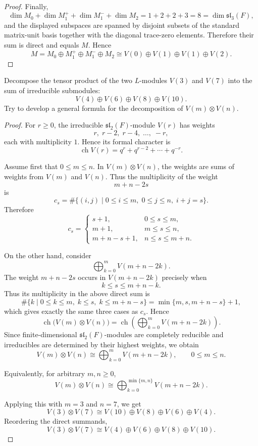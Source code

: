 \begin{proof}
    Finally,
    \[
    \dim M_0+\dim M_1^++\dim M_1^-+\dim M_2
    =
    1+2+2+3=8=\dim \mathfrak{sl}_3(F),
    \]
    and the displayed subspaces are spanned by disjoint subsets of the standard
    matrix-unit basis together with the diagonal trace-zero elements. Therefore their
    sum is direct and equals \(M\). Hence
    \[
    M
    =
    M_0\oplus M_1^+\oplus M_1^-\oplus M_2
    \cong
    V(0)\oplus V(1)\oplus V(1)\oplus V(2).
    \]
    \end{proof}

\begin{exercise}
    [P34, Ex6] Decompose the tensor product of the two \(L\)-modules \(V(3)\) and \(V(7)\) into the sum of irreducible submodules:
    \[
        V(4)\oplus V(6)\oplus V(8)\oplus V(10).
    \]
    Try to develop a general formula for the decomposition of \(V(m)\otimes V(n)\).
\end{exercise}

\begin{proof}
    For \(r\geq 0\), the irreducible \(\mathfrak{sl}_2(F)\)-module \(V(r)\) has
    weights
    \[
    r,\; r-2,\; r-4,\;\ldots,\;-r,
    \]
    each with multiplicity \(1\). Hence its formal character is
    \[
    \operatorname{ch}V(r)=q^r+q^{r-2}+\cdots+q^{-r}.
    \]
    
    Assume first that \(0\leq m\leq n\). In \(V(m)\otimes V(n)\), the weights are
    sums of weights from \(V(m)\) and \(V(n)\). Thus the multiplicity of the weight
    \[
    m+n-2s
    \]
    is
    \[
    c_s
    =
    \#\{(i,j)\mid 0\leq i\leq m,\;0\leq j\leq n,\; i+j=s\}.
    \]
    Therefore
    \[
    c_s=
    \begin{cases}
    s+1, & 0\leq s\leq m,\\
    m+1, & m\leq s\leq n,\\
    m+n-s+1, & n\leq s\leq m+n.
    \end{cases}
    \]
    
    On the other hand, consider
    \[
    \bigoplus_{k=0}^{m} V(m+n-2k).
    \]
    The weight \(m+n-2s\) occurs in \(V(m+n-2k)\) precisely when
    \[
    k\leq s\leq m+n-k.
    \]
    Thus its multiplicity in the above direct sum is
    \[
    \#\{k\mid 0\leq k\leq m,\; k\leq s,\; k\leq m+n-s\}
    =
    \min\{m,s,m+n-s\}+1,
    \]
    which gives exactly the same three cases as \(c_s\). Hence
    \[
    \operatorname{ch}\bigl(V(m)\otimes V(n)\bigr)
    =
    \operatorname{ch}\left(\bigoplus_{k=0}^{m}V(m+n-2k)\right).
    \]
    Since finite-dimensional \(\mathfrak{sl}_2(F)\)-modules are completely reducible
    and irreducibles are determined by their highest weights, we obtain
    \[
    V(m)\otimes V(n)
    \cong
    \bigoplus_{k=0}^{m}V(m+n-2k),
    \qquad 0\leq m\leq n.
    \]
    
    Equivalently, for arbitrary \(m,n\geq 0\),
    \[
    V(m)\otimes V(n)
    \cong
    \bigoplus_{k=0}^{\min\{m,n\}} V(m+n-2k).
    \]
    
    Applying this with \(m=3\) and \(n=7\), we get
    \[
    V(3)\otimes V(7)
    \cong
    V(10)\oplus V(8)\oplus V(6)\oplus V(4).
    \]
    Reordering the direct summands,
    \[
    V(3)\otimes V(7)
    \cong
    V(4)\oplus V(6)\oplus V(8)\oplus V(10).
    \]
    \end{proof}

